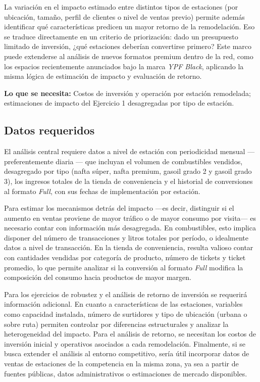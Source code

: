 La variación en el impacto estimado entre distintos tipos de estaciones (por ubicación, tamaño, perfil de clientes o nivel de ventas previo) permite además identificar qué características predicen un mayor retorno de la remodelación. Eso se traduce directamente en un criterio de priorización: dado un presupuesto limitado de inversión, ¿qué estaciones deberían convertirse primero?
Este marco puede extenderse al análisis de nuevos formatos premium dentro de la red, como los espacios recientemente anunciados bajo la marca \emph{YPF Black}, aplicando la misma lógica de estimación de impacto y evaluación de retorno.

\textbf{Lo que se necesita:} Costos de inversión y operación por estación remodelada; estimaciones de impacto del Ejercicio 1 desagregadas por tipo de estación.


\subsection{Datos requeridos} 

El análisis central requiere datos a nivel de estación con periodicidad mensual 
— preferentemente diaria — que incluyan el volumen de combustibles vendidos, desagregado por tipo (nafta súper, nafta premium, gasoil grado 2 y gasoil grado 3), los ingresos totales de la tienda de conveniencia y el historial de conversiones al formato \emph{Full}, con sus fechas de implementación por estación.

Para estimar los mecanismos detrás del impacto —es decir, distinguir si el aumento en ventas proviene de mayor tráfico o de mayor consumo por visita— es necesario contar con información más desagregada. En combustibles, esto implica disponer del número de transacciones y litros totales por período, o idealmente datos a nivel de transacción. En la tienda de conveniencia, resulta valioso contar con cantidades vendidas por categoría de producto, número de tickets y ticket promedio, lo que permite analizar si la conversión al formato \emph{Full} modifica la composición del consumo hacia productos de mayor margen.

Para los ejercicios de robustez y el análisis de retorno de inversión se requerirá información adicional. En cuanto a características de las estaciones, variables como capacidad instalada, número de surtidores y tipo de ubicación (urbana o sobre ruta) permiten controlar por diferencias estructurales y analizar la heterogeneidad del impacto. Para el análisis de retorno, se necesitan los costos de inversión inicial y operativos asociados a cada remodelación. Finalmente, si se busca extender el análisis al entorno competitivo, sería útil incorporar datos de ventas de estaciones de la competencia en la misma zona, ya sea a partir de fuentes públicas, datos administrativos o estimaciones de mercado disponibles.




